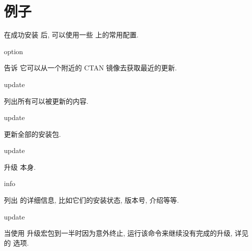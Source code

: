 
\section{例子}\label{sec:examples}

在成功安装 \tl 后, 可以使用一些 \tlmgr 上的常用配置. 

\begin{description}
    \item \tlmgr{} \ac{option}  \par
    告诉 \tlmgr 它可以从一个附近的 CTAN 镜像去获取最近的更新. 
    \item \tlmgr{} \ac{update} \par
    列出所有可以被更新的内容. 
    \item \tlmgr{} \ac{update} \par
    更新全部的安装包. 
    \item \tlmgr{} \ac{update} \par
    升级 \tlmgr 本身. 
    \item \tlmgr{} \ac{info} \par
    列出  的详细信息, 比如它们的安装状态, 版本号, 介绍等等. 
    \item \tlmgr{} \ac{update}  \par
    当使用 \tlmgr{} 升级宏包到一半时因为意外终止, 运行该命令来继续没有完成的升级, 详见  的 \hyperlink{op:-reinstall-forcibly-removed}{} 选项.
\end{description}


